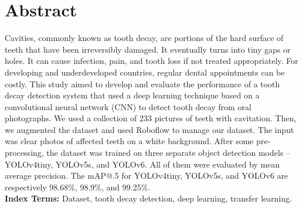 \chapter*{\centering Abstract}

\pagestyle{fancy}
\fancyhf{}
\fancyhead[LE,RO]{\thepage}


Cavities, commonly known as tooth decay, are portions of the hard surface of teeth that have been irreversibly damaged. It eventually turns into tiny gaps or holes. It can cause infection, pain, and tooth loss if not treated appropriately. For developing and underdeveloped countries, regular dental appointments can be costly. This study aimed to develop and evaluate the performance of a tooth decay detection system that used a deep learning technique based on a convolutional neural network (CNN) to detect tooth decay from oral photographs. We used a collection of 233 pictures of teeth with cavitation. Then, we augmented the dataset and used Roboflow to manage our dataset. The input was clear photos of affected teeth on a white background. After some pre-processing, the dataset was trained on three separate object detection models – YOLOv4tiny, YOLOv5s, and YOLOv6. All of them were evaluated by mean average precision. The mAP@.5 for   YOLOv4tiny, YOLOv5s, and YOLOv6 are respectively 98.68\%, 98.9\%, and 99.25\%.\\
\textbf{Index Terms: }Dataset, tooth decay detection, deep learning, transfer learning.

